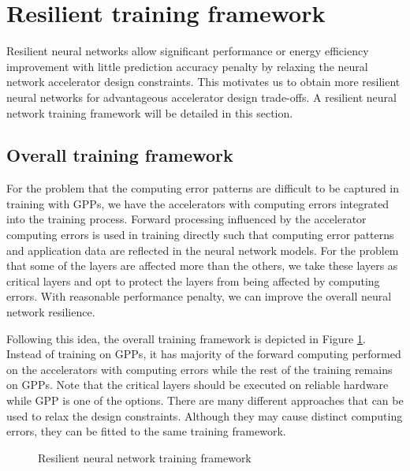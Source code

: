 \section{Resilient training framework} \label{sec:framework}
Resilient neural networks allow significant performance or 
energy efficiency improvement with little prediction accuracy penalty 
by relaxing the neural network accelerator design constraints. 
This motivates us to obtain more resilient neural networks 
for advantageous accelerator design trade-offs. 
A resilient neural network training framework will be 
detailed in this section. 

\subsection{Overall training framework}
For the problem that the computing error patterns are 
difficult to be captured in training with GPPs, 
we have the accelerators with computing errors integrated into 
the training process. Forward processing influenced by 
the accelerator computing errors is used in training directly 
such that computing error patterns and application data are 
reflected in the neural network models. For the problem that 
some of the layers are affected more than the others, 
we take these layers as critical layers and opt to 
protect the layers from being affected by computing errors. 
With reasonable performance penalty, we can improve the 
overall neural network resilience. 

Following this idea, the overall training framework is depicted in Figure \ref{fig:retrain}. 
Instead of training on GPPs, it has majority of the forward computing performed on the 
accelerators with computing errors while the rest of the training remains on GPPs.
Note that the critical layers should be executed on reliable hardware 
while GPP is one of the options. There are many different approaches 
that can be used to relax the design constraints.
Although they may cause distinct computing errors, they can be fitted to the 
same training framework.

\begin{figure}
        \caption{Resilient neural network training framework}
        \label{fig:retrain}
\end{figure}

